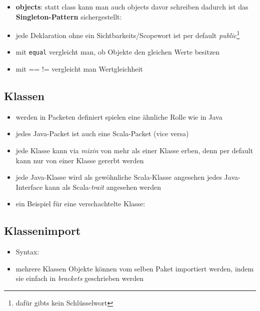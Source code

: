 \begin{itemize}
  
  \item \textbf{objects}: statt class kann man auch objects davor schreiben
  \und dadurch ist das \textbf{Singleton-Pattern} sichergestellt:
  
  
  
  \item jede Deklaration ohne ein Sichtbarkeits/Scopewort ist per default
  \textit{public}\footnote{dafür gibts kein Schlüsselwort}
  \item mit \texttt{equal} vergleicht man, ob Objekte den gleichen
  Werte besitzen
  \item mit == \und != vergleicht man Wertgleichheit

\end{itemize}


\subsection{Klassen}
\begin{itemize}
  \item werden in Packeten definiert \und spielen eine ähnliche Rolle wie
  in Java
  \item jedes Java-Packet ist auch eine Scala-Packet (vice versa)
  \item jede Klasse kann via \textit{mixin} von mehr als einer Klasse
  erben, denn per default kann nur von einer Klasse gererbt werden
  \item jede Java-Klasse wird als gewöhnliche Scala-Klasse angesehen \und 
  jedes Java-Interface kann als Scala-\textit{trait} angesehen werden
  \item ein Beispiel für eine verschachtelte Klasse:
  
  

\end{itemize}


\subsection{Klassenimport}
\begin{itemize}
  \item Syntax:
  
  
  
  \item mehrere Klassen \oder Objekte können vom selben Paket importiert werden, 
  indem sie einfach in \textit{brackets} geschrieben werden
\end{itemize}


